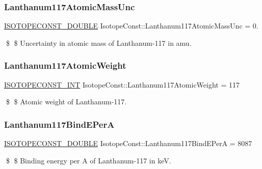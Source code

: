 \subsubsection{\texorpdfstring{Lanthanum117\+Atomic\+Mass\+Unc}{Lanthanum117AtomicMassUnc}}
{\footnotesize\ttfamily \mbox{\hyperlink{group___isotope_const-_macros_ga8f45a7272ce02c0b4c65c44636ed719a}{I\+S\+O\+T\+O\+P\+E\+C\+O\+N\+S\+T\+\_\+\+D\+O\+U\+B\+LE}} Isotope\+Const\+::\+Lanthanum117\+Atomic\+Mass\+Unc = 0.}

\$ \$ Uncertainty in atomic mass of Lanthanum-\/117 in amu. \mbox{\label{group___isotope_const-_lanthanum-_la117_ga62f099ae9eb7a96d6ecf40936637c6ad}} 
\subsubsection{\texorpdfstring{Lanthanum117\+Atomic\+Weight}{Lanthanum117AtomicWeight}}
{\footnotesize\ttfamily \mbox{\hyperlink{group___isotope_const-_macros_ga5f18360b3e99483a35c32d789e62621c}{I\+S\+O\+T\+O\+P\+E\+C\+O\+N\+S\+T\+\_\+\+I\+NT}} Isotope\+Const\+::\+Lanthanum117\+Atomic\+Weight = 117}

\$ \$ Atomic weight of Lanthanum-\/117. \mbox{\label{group___isotope_const-_lanthanum-_la117_ga0f12f1cd0bda0d14386dfb5dfa2b394d}} 
\subsubsection{\texorpdfstring{Lanthanum117\+Bind\+E\+PerA}{Lanthanum117BindEPerA}}
{\footnotesize\ttfamily \mbox{\hyperlink{group___isotope_const-_macros_ga8f45a7272ce02c0b4c65c44636ed719a}{I\+S\+O\+T\+O\+P\+E\+C\+O\+N\+S\+T\+\_\+\+D\+O\+U\+B\+LE}} Isotope\+Const\+::\+Lanthanum117\+Bind\+E\+PerA = 8087}

\$ \$ Binding energy per A of Lanthanum-\/117 in keV. \mbox{\label{group___isotope_const-_lanthanum-_la117_gaed3003b9ca06b0e773afa0a1200fe6f4}} 
